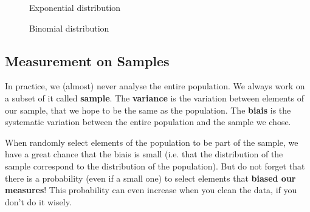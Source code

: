 \documentclass[a4paper,11pt,twoside]{article}
\begin{document}
\begin{figure}[H]
{ 
}
\caption{\label{exp} 
Exponential distribution 
} 
\centerline{
}
\caption{\label{binomial} 
Binomial distribution 
} 
\end{figure}



\subsection{Measurement on Samples}

In practice, we (almost) never analyse the entire population. We always work on a subset of it called \textbf{sample}. The \textbf{variance} is the variation between elements of our sample, that we hope to be the same as the population. The \textbf{biais} is the systematic variation between the entire population and the sample we chose.

When randomly select elements of the population to be part of the sample, we have a great chance that the biais is small (i.e. that the distribution of the sample correspond to the distribution of the population). But do not forget that there is a probability (even if a small one) to select elements that \textbf{biased our measures}! This probability can even increase when you clean the data, if you don't do it wisely.
\end{document}
